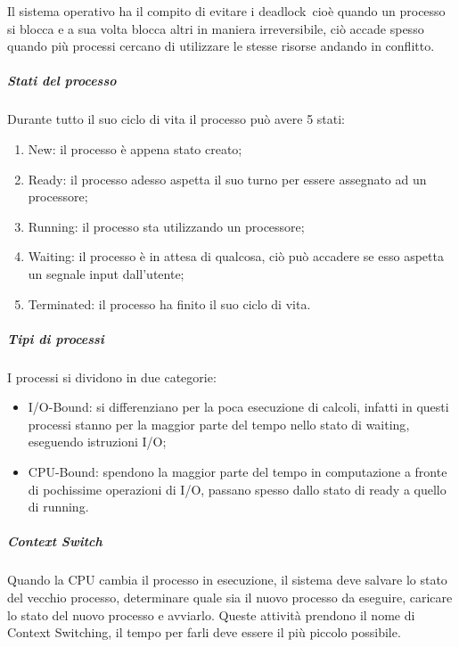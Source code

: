 \documentclass[
]{article}
\providecommand{\tightlist}{%
  \setlength{\itemsep}{0pt}\setlength{\parskip}{0pt}}
\begin{document}
{}

{Il sistema operativo ha il compito di evitare i }{deadlock}{~cioè
quando un processo si blocca e a sua volta blocca altri in maniera
irreversibile, ciò accade spesso quando più processi cercano di
utilizzare le stesse risorse andando in conflitto.}

\subparagraph{\texorpdfstring{{Stati del
processo}}{Stati del processo}}\label{h.iqsfilp0d9ux}

{Durante tutto il suo ciclo di vita il processo può avere 5 stati:}

{}

\begin{enumerate}
\tightlist
\item
  {New}{: il processo è appena stato creato;}
\item
  {Ready}{: il processo adesso aspetta il suo turno per essere assegnato
  ad un processore;}
\item
  {Running}{: il processo sta utilizzando un processore;}
\item
  {Waiting}{: il processo è in attesa di qualcosa, ciò può accadere se
  esso aspetta un segnale input dall'utente;}
\item
  {Terminated}{: il processo ha finito il suo ciclo di vita.}
\end{enumerate}

\subparagraph{\texorpdfstring{{Tipi di
processi}}{Tipi di processi}}\label{h.vukodmm6xr7k}

{I processi si dividono in due categorie:}

{}

\begin{itemize}
\tightlist
\item
  {I/O-Bound}{: si differenziano per la poca esecuzione di calcoli,
  infatti in questi processi stanno per la maggior parte del tempo nello
  stato di }{waiting}{, eseguendo istruzioni I/O;}
\item
  {CPU-Bound}{: spendono la maggior parte del tempo in computazione a
  fronte di pochissime operazioni di I/O, passano spesso dallo stato di
  }{ready }{a quello di }{running}{.}
\end{itemize}

\subparagraph{\texorpdfstring{{Context
Switch}}{Context Switch}}\label{h.9zgszgeo657u}

{Quando la CPU cambia il processo in esecuzione, il sistema deve salvare
lo stato del vecchio processo, determinare quale sia il nuovo processo
da eseguire, caricare lo stato del nuovo processo e avviarlo. Queste
attività prendono il nome di }{Context Switching}{, il tempo per farli
deve essere il più piccolo possibile.}
\end{document}
